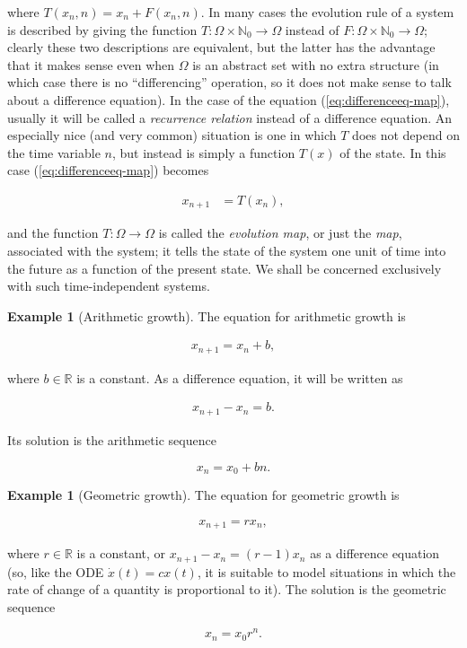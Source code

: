 \documentclass[11pt]{report}
\theoremstyle{plain}
\theoremstyle{definition}
\newtheorem{example}[thm]{Example}
\begin{document}
where $T(x_n,n)=x_n+F(x_n,n)$. In many cases the
evolution rule of a system is described by giving the
function $T:\Omega\times \mathbb{N}_0\to\Omega$
instead of $F:\Omega\times \mathbb{N}_0\to\Omega$;
clearly these two descriptions are equivalent, but the
latter has the advantage that it makes sense even when
$\Omega$ is an abstract set with no extra structure
(in which case there is no ``differencing'' operation,
so it does not make sense to talk about a difference
equation). In the case of the equation
(\ref{eq:differenceeq-map}), usually it will be called a
\emph{recurrence relation} instead of a difference
equation. An especially nice (and very common)
situation is one in which $T$ does not depend on the
time variable $n$, but instead is simply a function
$T(x)$ of the state. In this case
(\ref{eq:differenceeq-map}) becomes

\begin{align*}
x_{n+1} &= T(x_n),
\end{align*}

and the function $T:\Omega\to\Omega$ is called the
\emph{evolution map}, or just the \emph{map}, associated with
the system; it tells the state of the system one unit
of time into the future as a function of the present
state. We shall be concerned exclusively with such
time-independent systems.

\begin{example}[Arithmetic growth]
The equation for arithmetic growth is

\begin{align*}
x_{n+1} = x_n + b,
\end{align*}

where $b\in\mathbb{R}$ is a constant. As a difference
equation, it will be written as

\begin{align*}
x_{n+1}-x_n = b.
\end{align*}

Its solution is the arithmetic sequence

\[
x_n = x_0 + bn.
\]

\end{example}

\begin{example}[Geometric growth]
The equation for geometric growth is

\begin{align*}
x_{n+1} = r x_n ,
\end{align*}

where $r\in\mathbb{R}$ is a constant, or
$x_{n+1}-x_n = (r-1)x_n$ as a difference equation
(so, like the ODE $\dot{x}(t)=cx(t)$, it is suitable
to model situations in which the rate of change of a
quantity is proportional to it). The solution is the
geometric sequence

\[
x_n = x_0 r^n.
\]

\end{example}
\end{document}
